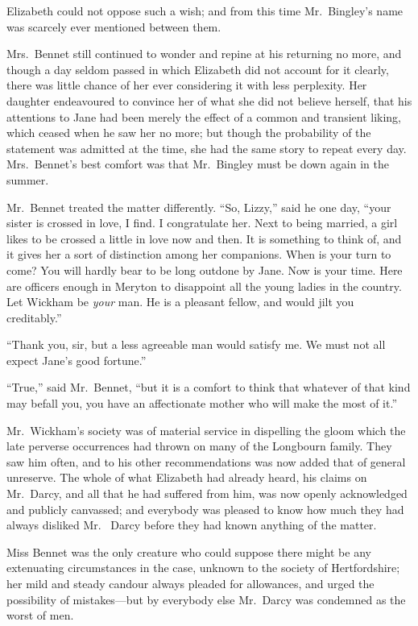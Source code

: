 Elizabeth could not oppose such a wish; and from this time
Mr.\ Bingley's name was scarcely ever mentioned between them.

Mrs.\ Bennet still continued to wonder and repine at his returning
no more, and though a day seldom passed in which Elizabeth did
not account for it clearly, there was little chance of her ever
considering it with less perplexity.  Her daughter endeavoured
to convince her of what she did not believe herself, that his
attentions to Jane had been merely the effect of a common and
transient liking, which ceased when he saw her no more; but
though the probability of the statement was admitted at the time,
she had the same story to repeat every day.  Mrs.\ Bennet's best
comfort was that Mr.\ Bingley must be down again in the
summer.

Mr.\ Bennet treated the matter differently.  ``So, Lizzy,'' said he
one day, ``your sister is crossed in love, I find.  I congratulate
her.  Next to being married, a girl likes to be crossed a little in
love now and then.  It is something to think of, and it gives her a
sort of distinction among her companions.  When is your turn to
come?  You will hardly bear to be long outdone by Jane.  Now is
your time.  Here are officers enough in Meryton to disappoint all
the young ladies in the country.  Let Wickham be \emph{your} man.  He
is a pleasant fellow, and would jilt you creditably.''

``Thank you, sir, but a less agreeable man would satisfy me.  We
must not all expect Jane's good fortune.''

``True,'' said Mr.\ Bennet, ``but it is a comfort to think that
whatever of that kind may befall you, you have an affectionate
mother who will make the most of it.''

Mr.\ Wickham's society was of material service in dispelling the
gloom which the late perverse occurrences had thrown on many
of the Longbourn family.  They saw him often, and to his other
recommendations was now added that of general unreserve.
The whole of what Elizabeth had already heard, his claims on
Mr.\ Darcy, and all that he had suffered from him, was now
openly acknowledged and publicly canvassed; and everybody
was pleased to know how much they had always disliked Mr.\ %
Darcy before they had known anything of the matter.

Miss Bennet was the only creature who could suppose there might
be any extenuating circumstances in the case, unknown to the
society of Hertfordshire; her mild and steady candour always
pleaded for allowances, and urged the possibility of mistakes---but
by everybody else Mr.\ Darcy was condemned as the worst of men.



